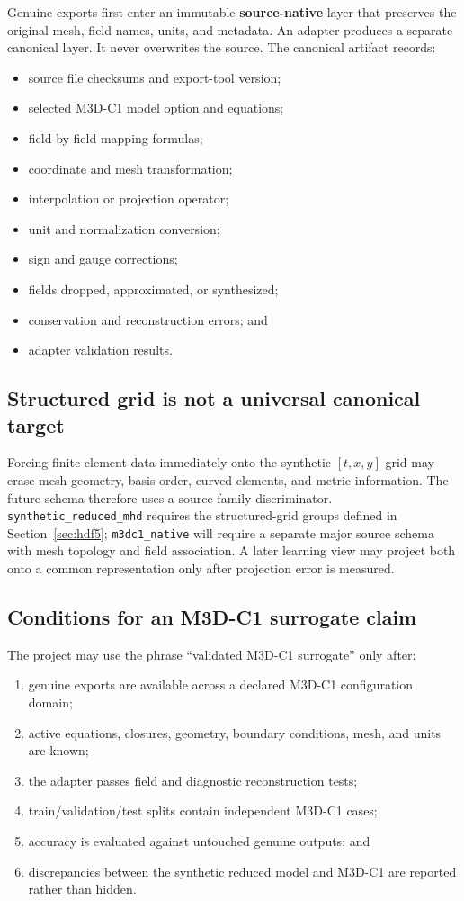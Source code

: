 \documentclass[11pt]{article}
\newcommand{\code}[1]{\texttt{#1}}
\begin{document}
Genuine exports first enter an immutable \textbf{source-native} layer that preserves the original mesh, field names, units, and metadata. An adapter produces a separate canonical layer. It never overwrites the source. The canonical artifact records:
\begin{itemize}
  \item source file checksums and export-tool version;
  \item selected M3D-C1 model option and equations;
  \item field-by-field mapping formulas;
  \item coordinate and mesh transformation;
  \item interpolation or projection operator;
  \item unit and normalization conversion;
  \item sign and gauge corrections;
  \item fields dropped, approximated, or synthesized;
  \item conservation and reconstruction errors; and
  \item adapter validation results.
\end{itemize}

\subsection{Structured grid is not a universal canonical target}

Forcing finite-element data immediately onto the synthetic $[t,x,y]$ grid may erase mesh geometry, basis order, curved elements, and metric information. The future schema therefore uses a source-family discriminator. \code{synthetic\_reduced\_mhd} requires the structured-grid groups defined in Section~\ref{sec:hdf5}; \code{m3dc1\_native} will require a separate major source schema with mesh topology and field association. A later learning view may project both onto a common representation only after projection error is measured.

\subsection{Conditions for an M3D-C1 surrogate claim}

The project may use the phrase ``validated M3D-C1 surrogate'' only after:
\begin{enumerate}[label=\arabic*.]
  \item genuine exports are available across a declared M3D-C1 configuration domain;
  \item active equations, closures, geometry, boundary conditions, mesh, and units are known;
  \item the adapter passes field and diagnostic reconstruction tests;
  \item train/validation/test splits contain independent M3D-C1 cases;
  \item accuracy is evaluated against untouched genuine outputs; and
  \item discrepancies between the synthetic reduced model and M3D-C1 are reported rather than hidden.
\end{enumerate}
\end{document}
